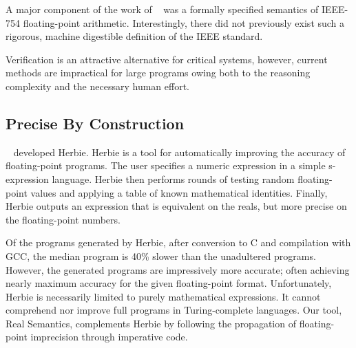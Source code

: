A major component of the work of \citeauthor{verifiedfp}~\cite{verifiedfp} was a formally specified semantics of IEEE-754 floating-point arithmetic. Interestingly, there did not previously exist such a rigorous, machine digestible definition of the IEEE standard.

Verification is an attractive alternative for critical systems, however, current methods are impractical for large programs owing both to the reasoning complexity and the necessary human effort.

\subsection{Precise By Construction}

\citeauthor{herbie}~\cite{herbie} developed Herbie. Herbie is a tool for automatically improving the accuracy of floating-point programs. The user specifies a numeric expression in a simple s-expression language. Herbie then performs rounds of testing random floating-point values and applying a table of known mathematical identities. Finally, Herbie outputs an expression that is equivalent on the reals, but more precise on the floating-point numbers.

Of the programs generated by Herbie, after conversion to C and compilation with GCC, the median program is 40\% slower than the unadultered programs. However, the generated programs are impressively more accurate; often achieving nearly maximum accuracy for the given floating-point format. Unfortunately, Herbie is necessarily limited to purely mathematical expressions. It cannot comprehend nor improve full programs in Turing-complete languages. Our tool, Real Semantics, complements Herbie by following the propagation of floating-point imprecision through imperative code.
